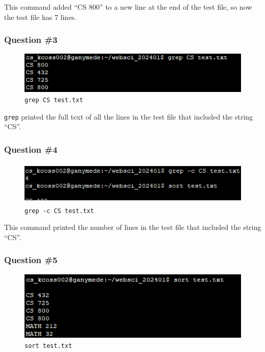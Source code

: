 \documentclass[
]{article}
\begin{document}
This command added ``CS 800'' to a new line at the end of the test file,
so now the test file has 7 lines.

\hypertarget{question-3}{%
\subsubsection{Question \#3}\label{question-3}}

\begin{figure}
\centering
\includegraphics{linux_cmd_3_grepCS.png}
\caption{\texttt{grep\ CS\ test.txt}}
\end{figure}

\texttt{grep} printed the full text of all the lines in the test file
that included the string ``CS''.

\hypertarget{question-4}{%
\subsubsection{Question \#4}\label{question-4}}

\begin{figure}
\centering
\includegraphics[width=4.92708in,height=0.80208in]{linux_cmd_4_grepc.png}
\caption{\texttt{grep\ -c\ CS\ test.txt}}
\end{figure}

This command printed the number of lines in the test file that included
the string ``CS''.

\hypertarget{question-5}{%
\subsubsection{Question \#5}\label{question-5}}

\begin{figure}
\centering
\includegraphics{linux_cmd_5_sort.png}
\caption{\texttt{sort\ test.txt}}
\end{figure}
\end{document}
